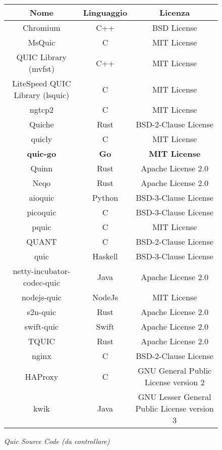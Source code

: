\begin{figure}[!h]
    \centering
    \begin{tabular}{|c|c|c|}
        \hline
        \textbf{Nome} & \textbf{Linguaggio} & \textbf{Licenza} \\
        \hline
        Chromium & C++ & BSD License \\
        \hline
        MsQuic & C & MIT License \\
        \hline
        QUIC Library (mvfst) & C++ & MIT License \\
        \hline
        LiteSpeed QUIC Library (lsquic) & C & MIT License \\
        \hline
        ngtcp2 & C & MIT License \\
        \hline
        Quiche & Rust & BSD-2-Clause License \\
        \hline
        quicly & C & MIT License \\
        \hline
        \textbf{quic-go} & \textbf{Go} & \textbf{MIT License} \\
        \hline
        Quinn & Rust & Apache License 2.0 \\
        \hline
        Neqo & Rust & Apache License 2.0 \\
        \hline
        aioquic & Python & BSD-3-Clause License \\
        \hline
        picoquic & C & BSD-3-Clause License \\
        \hline
        pquic & C & MIT License \\
        \hline
        QUANT & C & BSD-2-Clause License \\
        \hline
        quic & Haskell & BSD-3-Clause License \\
        \hline
        netty-incubator-codec-quic & Java & Apache License 2.0 \\
        \hline
        nodejs-quic & NodeJs & MIT License \\
        \hline
        s2n-quic & Rust & Apache License 2.0 \\
        \hline
        swift-quic & Swift & Apache License 2.0 \\
        \hline
        TQUIC & Rust & Apache License 2.0 \\
        \hline
        nginx & C & BSD-2-Clause License \\
        \hline
        HAProxy & C & GNU General Public License version 2 \\
        \hline
        kwik & Java & GNU Lesser General Public License version 3 \\
        \hline
    \end{tabular}
    \caption{\emph{Quic Source Code (da controllare)}}
    \label{table-implementazioni-quic}
\end{figure}

